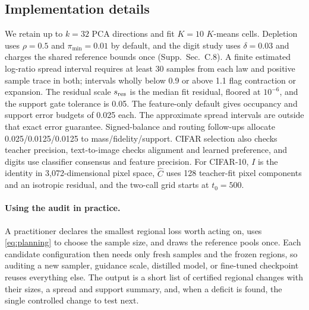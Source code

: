 \subsection{Implementation details}
\label{sec:implementation}
We retain up to $k=32$ PCA directions and fit $K=10$ $K$-means cells.
Depletion uses $\rho=0.5$ and $\pi_{\min}=0.01$ by default, and the digit
study uses $\delta=0.03$ and charges the shared reference bounds once
(Supp.~Sec.~C.8). A finite estimated log-ratio spread interval requires at
least 30 samples from each law and positive sample trace in both;
intervals wholly below 0.9 or above 1.1 flag contraction or expansion.
The residual scale $s_{\rm res}$ is the median fit residual, floored at
$10^{-6}$, and the support gate tolerance is 0.05. The feature-only
default gives occupancy and support error budgets of 0.025 each. The
approximate spread intervals are outside that exact error guarantee.
Signed-balance and routing follow-ups allocate 0.025/0.0125/0.0125 to
mass/fidelity/support. CIFAR selection also checks teacher precision,
text-to-image checks alignment and learned preference, and digits use
classifier consensus and feature precision. For CIFAR-10, $I$ is the
identity in 3,072-dimensional pixel space, $\widehat C$ uses 128
teacher-fit pixel components and an isotropic residual, and the two-call
grid starts at $t_0=500$.

\paragraph{Using the audit in practice.}
A practitioner declares the smallest regional loss worth acting on, uses
\cref{eq:planning} to choose the sample size, and draws the reference
pools once. Each candidate configuration then needs only fresh samples and
the frozen regions, so auditing a new sampler, guidance scale, distilled
model, or fine-tuned checkpoint reuses everything else. The output is a
short list of certified regional changes with their sizes, a spread and
support summary, and, when a deficit is found, the single controlled
change to test next.
